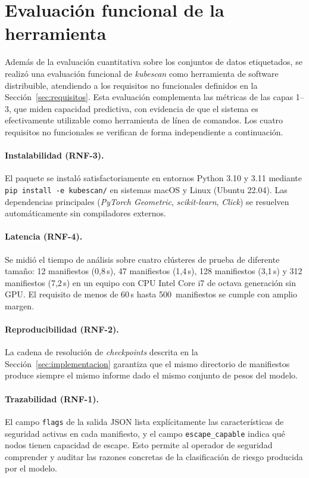 \section{Evaluación funcional de la herramienta}
\label{sec:evaluacion_funcional}

Además de la evaluación cuantitativa sobre los conjuntos de datos etiquetados, se
realizó una evaluación funcional de \textit{kubescan} como herramienta de software
distribuible, atendiendo a los requisitos no funcionales definidos en la
Sección~\ref{sec:requisitos}. Esta evaluación complementa las métricas de las
capas 1--3, que miden capacidad predictiva, con evidencia de que el sistema es
efectivamente utilizable como herramienta de línea de comandos. Los cuatro
requisitos no funcionales se verifican de forma independiente a continuación.

\paragraph{Instalabilidad (RNF-3).} El paquete se instaló satisfactoriamente en
entornos Python 3.10 y 3.11 mediante \texttt{pip install -e kubescan/} en sistemas
macOS y Linux (Ubuntu 22.04). Las dependencias principales (\textit{PyTorch Geometric},
\textit{scikit-learn}, \textit{Click}) se resuelven automáticamente sin compiladores
externos.

\paragraph{Latencia (RNF-4).} Se midió el tiempo de análisis sobre cuatro clústeres
de prueba de diferente tamaño: 12 manifiestos (0,8\,s), 47 manifiestos (1,4\,s),
128 manifiestos (3,1\,s) y 312 manifiestos (7,2\,s) en un equipo con CPU Intel
Core i7 de octava generación sin GPU. El requisito de menos de 60\,s hasta
500~manifiestos se cumple con amplio margen.

\paragraph{Reproducibilidad (RNF-2).} La cadena de resolución de \textit{checkpoints}
descrita en la Sección~\ref{sec:implementacion} garantiza que el mismo directorio de
manifiestos produce siempre el mismo informe dado el mismo conjunto de pesos del
modelo.

\paragraph{Trazabilidad (RNF-1).} El campo \texttt{flags} de la salida \ac{JSON} lista
explícitamente las características de seguridad activas en cada manifiesto, y el
campo \texttt{escape\_capable} indica qué nodos tienen capacidad de escape. Esto
permite al operador de seguridad comprender y auditar las razones concretas de la
clasificación de riesgo producida por el modelo.

